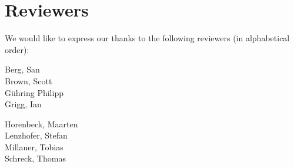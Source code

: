 \section{Reviewers}

We would like to express our thanks to the following reviewers (in alphabetical order):


\vline{}

\begin{minipage}[b]{0.5\linewidth}
\center
Berg, San \\
Brown, Scott \\
G\"uhring Philipp  \\
Grigg, Ian  \\
\end{minipage}
\begin{minipage}[b]{0.5\linewidth}
\center
Horenbeck, Maarten \\
Lenzhofer, Stefan \\
Millauer, Tobias \\
Schreck, Thomas  \\
\end{minipage}


